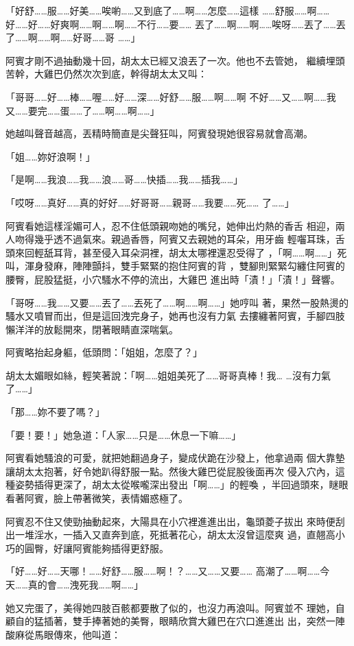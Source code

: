 「好舒……服……好美……唉喲……又到底了……啊……怎麼……這樣
……舒服……啊……好……好……好爽啊……啊……啊……不行……要……
丟了……啊……啊……唉呀……丟了……丟了……啊……啊……好哥……哥
……」

阿賓才剛不過抽動幾十回，胡太太已經又浪丟了一次。他也不去管她，
繼續埋頭苦幹，大雞巴仍然次次到底，幹得胡太太又叫：

「哥哥……好……棒……喔……好……深……好舒……服……啊……啊
不好……又……啊……我又……要完……蛋……了……啊……啊……」

她越叫聲音越高，丟精時簡直是尖聲狂叫，阿賓發現她很容易就會高潮。

「姐……妳好浪啊！」

「是啊……我浪……我……浪……哥……快插……我……插我……」

「哎呀……真好……真的好好……好哥哥……親哥……我要……死……
了……」

阿賓看她這樣淫媚可人，忍不住低頭親吻她的嘴兒，她伸出灼熱的香舌
相迎，兩人吻得幾乎透不過氣來。親過香唇，阿賓又去親她的耳朵，用牙齒
輕囓耳珠，舌頭來回輕舐耳背，甚至侵入耳朵洞裡，胡太太哪裡還忍受得了
，「啊……啊……」死叫，渾身發麻，陣陣顫抖，雙手緊緊的抱住阿賓的背
，雙腳則緊緊勾纏住阿賓的腰臀，屁股猛挺，小穴騷水不停的流出，大雞巴
進出時「漬！」「漬！」聲響。

「哥呀……我……又要……丟了……丟死了……啊……啊……」她哼叫
著，果然一股熱燙的騷水又噴冒而出，但是這回洩完身子，她再也沒有力氣
去摟纏著阿賓，手腳四肢懶洋洋的放鬆開來，閉著眼睛直深喘氣。

阿賓略抬起身軀，低頭問：「姐姐，怎麼了？」

胡太太媚眼如絲，輕笑著說：「啊……姐姐美死了……哥哥真棒！我…
…沒有力氣了……」

「那……妳不要了嗎？」

「要！要！」她急道：「人家……只是……休息一下嘛……」

阿賓看她騷浪的可愛，就把她翻過身子，變成伏跪在沙發上，他拿過兩
個大靠墊讓胡太太抱著，好令她趴得舒服一點。然後大雞巴從屁股後面再次
侵入穴內，這種姿勢插得更深了，胡太太從喉嚨深出發出「啊……」的輕喚
，半回過頭來，瞇眼看著阿賓，臉上帶著微笑，表情媚惑極了。

阿賓忍不住又使勁抽動起來，大陽具在小穴裡進進出出，龜頭菱子拔出
來時便刮出一堆淫水，一插入又直奔到底，死抵著花心，胡太太沒曾這麼爽
過，直翹高小巧的圓臀，好讓阿賓能夠插得更舒服。

「好……好……天哪！……好舒……服……啊！？……又……又要……
高潮了……啊……今天……真的會……洩死我……啊……」

她又完蛋了，美得她四肢百骸都要散了似的，也沒力再浪叫。阿賓並不
理她，自顧自的猛插著，雙手捧著她的美臀，眼睛欣賞大雞巴在穴口進進出
出，突然一陣酸麻從馬眼傳來，他叫道：

